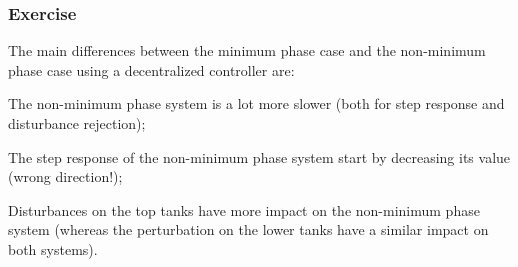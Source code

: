\subsubsection{Exercise} 

The main differences between the minimum phase case and the non-minimum phase case using a decentralized controller are:
\begin{shortitemize}
    \item The non-minimum phase system is a lot more slower (both for step response and disturbance rejection);
    \item The step response of the non-minimum phase system start by decreasing its value (wrong direction!);
    \item Disturbances on the top tanks have more impact on the non-minimum phase system (whereas the perturbation on the lower tanks have a similar impact on both systems).
\end{shortitemize}

